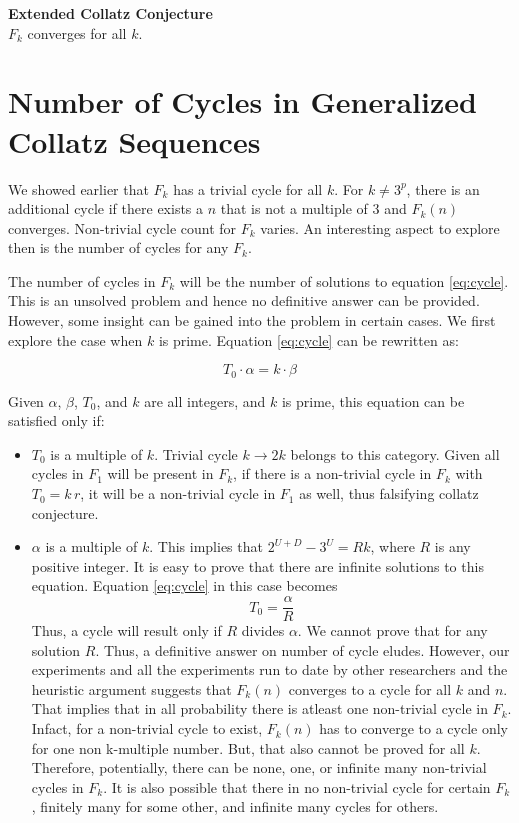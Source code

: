 \documentclass[12pt]{article} %
\begin{document}
\noindent
\textbf{Extended Collatz Conjecture}\\
$F_k$ converges for all $k$. 

\section{Number of Cycles in Generalized Collatz Sequences}

We showed earlier that $F_k$ has a trivial cycle for all $k$. For $k \neq 3^p$, there is an additional cycle if there exists a $n$ that is not a multiple of $3$ and $F_k(n)$ converges. Non-trivial cycle count for $F_k$ varies. An interesting aspect to explore then is the number of cycles for any $F_k$.

The number of cycles in $F_k$ will be the number of solutions to equation \eqref{eq:cycle}. This is an unsolved problem and hence no definitive answer can be provided. However, some insight can be gained into the problem in certain cases. We first explore the case when $k$ is prime. Equation \eqref{eq:cycle} can be rewritten as:

\[ T_0 \cdot  \alpha = k \cdot \beta \]

Given $\alpha$, $\beta$, $T_0$, and $k$ are all integers, and $k$ is prime, this equation can be satisfied only if:

\begin{itemize}
    \item $T_0$ is a multiple of $k$. Trivial cycle $k \rightarrow 2k$ belongs to this category. Given all cycles in $F_1$ will be present in $F_k$, if there is a non-trivial cycle in $F_k$ with $T_0 = k \, r$, it will be a non-trivial cycle in $F_1$ as well, thus falsifying collatz conjecture. 
    
    \item $\alpha$ is a multiple of $k$. This implies that $2^{U+D} - 3^U = R k$, where $R$ is any positive integer. It is easy to prove that there are infinite solutions to this equation. Equation \eqref{eq:cycle} in this case becomes
    \[T_0 = \frac{\alpha}{R} \]
    Thus, a cycle will result only if $R$ divides $\alpha$. We cannot prove that for any solution $R$. Thus, a definitive answer on number of cycle eludes. However, our experiments and all the experiments run to date by other researchers and the heuristic argument suggests that $F_k(n)$ converges to a cycle for all $k$ and $n$. That implies that in all probability there is atleast one non-trivial cycle in $F_k$. Infact, for a non-trivial cycle to exist, $F_k(n)$ has to converge to a cycle only for one non k-multiple number. But, that also cannot be proved for all $k$. Therefore, potentially, there can be none, one, or infinite many non-trivial cycles in $F_k$. It is also possible that there in no non-trivial cycle for certain $F_k$, finitely many for some other, and infinite many cycles for others.
\end{itemize}
\end{document}
